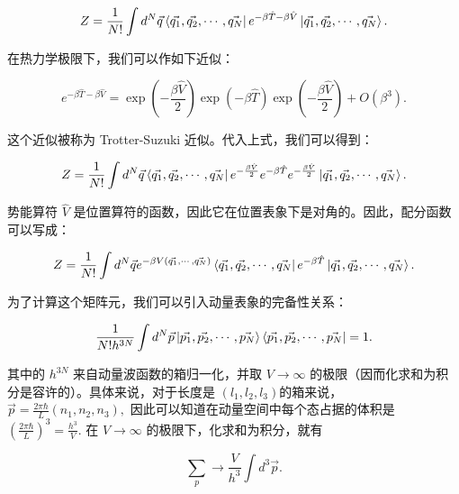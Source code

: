 \begin{linenomath}\begin{equation}
    Z = \frac{1}{N!} \int d^N\vec{q} \bra{\vec{q_1},\vec{q_2},\cdots, \vec{q_N}} e^{-\beta \hat{T}-\beta \hat{V}} \ket{\vec{q_1},\vec{q_2},\cdots, \vec{q_N}}.
\end{equation}\end{linenomath}
在热力学极限下，我们可以作如下近似：
\begin{linenomath}\begin{equation}
    e^{-\beta \hat{T}-\beta \hat{V}} = \exp\left( -\frac{\beta \hat{V}}{2} \right)\exp\left( -\beta \hat{T} \right) \exp\left( -\frac{\beta \hat{V}}{2} \right) + O(\beta^3).
\end{equation}\end{linenomath}
这个近似被称为 Trotter-Suzuki 近似。代入上式，我们可以得到：
\begin{linenomath}\begin{equation}
    Z = \frac{1}{N!} \int d^N\vec{q} \bra{\vec{q_1},\vec{q_2},\cdots, \vec{q_N}} e^{-\frac{\beta \hat{V}}{2}} e^{-\beta \hat{T}} e^{-\frac{\beta \hat{V}}{2}} \ket{\vec{q_1},\vec{q_2},\cdots, \vec{q_N}}.
\end{equation}\end{linenomath}
势能算符 $\hat{V}$ 是位置算符的函数，因此它在位置表象下是对角的。因此，配分函数可以写成：
\begin{linenomath}\begin{equation}
    Z = \frac{1}{N!} \int d^N\vec{q} e^{-\beta V(\vec{q_1},\cdots,\vec{q_N})} \bra{\vec{q_1},\vec{q_2},\cdots, \vec{q_N}} e^{-\beta \hat{T}} \ket{\vec{q_1},\vec{q_2},\cdots, \vec{q_N}}.
\end{equation}\end{linenomath}
为了计算这个矩阵元，我们可以引入动量表象的完备性关系：
\begin{linenomath}\begin{equation}
    \frac{1}{N!h^{3N}}\int d^N\vec{p} \ket{\vec{p_1},\vec{p_2},\cdots, \vec{p_N}} \bra{\vec{p_1},\vec{p_2},\cdots, \vec{p_N}} = 1.
\end{equation}\end{linenomath}
其中的 $h^{3N}$ 来自动量波函数的箱归一化，并取 $V\to \infty$ 的极限（因而化求和为积分是容许的）。具体来说，对于长度是 $\left( l_1,l_2,l_3 \right)$的箱来说， $\vec{p} = \frac{2\pi\hbar}{L}\left( n_1,n_2,n_3 \right),$ 因此可以知道在动量空间中每个态占据的体积是 $\left( \frac{2\pi\hbar}{L} \right)^3 = \frac{h^3}{V}.$ 在 $V\to \infty$ 的极限下，化求和为积分，就有
\begin{linenomath}\begin{equation}
\sum_p \to \frac{V}{h^3} \int d^3\vec{p}. 
\end{equation}\end{linenomath}
